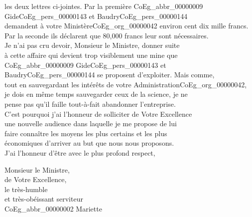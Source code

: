 \documentclass{book}
\begin{document}
les deux lettres ci-jointes. Par la première \gls{CoEg_abbr_00000009} Gide\gls{CoEg_pers_00000143} et Baudry\gls{CoEg_pers_00000144}\\
demandent à votre Ministère\gls{CoEg_org_00000042} environ cent dix mille francs.\\
Par la seconde ils déclarent que 80,000 francs leur sont nécessaires.\\
\indent Je n’ai pas cru devoir, Monsieur le Ministre, donner suite\\
à cette affaire qui devient trop visiblement une mine que\\
\gls{CoEg_abbr_00000009} Gide\gls{CoEg_pers_00000143} et Baudry\gls{CoEg_pers_00000144} se proposent d’exploiter. Mais comme,\\
tout en sauvegardant les intérêts de votre Administration\gls{CoEg_org_00000042},\\
je dois en même temps sauvegarder ceux de la science, je ne\\
pense pas qu’il faille tout-à-fait abandonner l’entreprise.\\
C’est pourquoi j’ai l’honneur de solliciter de Votre Excellence\\
une nouvelle audience dans laquelle je me propose de lui\\
faire connaître les moyens les plus certains et les plus\\
économiques d’arriver au but que nous nous proposons.\\
\indent J’ai l’honneur d’être avec le plus profond respect,
\begin{center}Monsieur le Ministre,\\
de Votre Excellence,\\
\hspace{5cm}le très-humble\\
\hspace{5cm}et très-obéissant serviteur\\
\hspace{5cm}\gls{CoEg_abbr_00000002} Mariette\end{center}

\hypertarget{CoEg_Mariette_1855-12-12}{}
\end{document}
